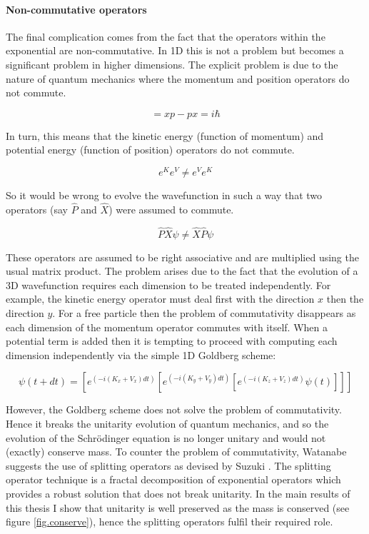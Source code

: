 \paragraph{Non-commutative operators}
The final complication comes from the fact that the operators within the exponential are non-commutative. In 1D this is not a problem but becomes a significant problem in higher dimensions. The explicit problem is due to the nature of quantum mechanics where the momentum and position operators do not commute.

\begin{equation}
 [x,p] = xp - px = i\hbar
\end{equation}

\noindent In turn, this means that the kinetic energy (function of momentum) and potential energy (function of position) operators do not commute.

\begin{equation}
e^{K}e^{V}   \ne  e^{V}e^{K} 
\end{equation}

\noindent So it would be wrong to evolve the wavefunction in such a way that two operators (say $\hat{P}$ and $\hat{X}$) were assumed to commute.

\begin{equation}
\hat{P} \hat{X} \psi \ne \hat{X} \hat{P} \psi
\end{equation}

\noindent These operators are assumed to be right associative and are multiplied using the usual matrix product. The problem arises due to the fact that the evolution of a 3D wavefunction requires each dimension to be treated independently. For example, the kinetic energy operator must deal first with the direction $x$ then the direction $y$. For a free particle then the problem of commutativity disappears as each dimension of the momentum operator commutes with itself. When a potential term is added then it is tempting to proceed with computing each dimension independently via the simple 1D Goldberg scheme:

\begin{equation}
\psi(t+dt) = [e^{(-i(K_x + V_x)dt)}  [e^{(-i(K_y + V_y)dt)}  [e^{(-i(K_z + V_z)dt)}\psi(t)]]]
\end{equation}

\noindent However, the Goldberg scheme does not solve the problem of commutativity. Hence it breaks the unitarity evolution of quantum mechanics, and so the evolution of the Schr\"odinger equation is no longer unitary and would not (exactly) conserve mass. To counter the problem of commutativity, Watanabe suggests the use of splitting operators as devised by Suzuki \citep{bib_suz}. The splitting operator technique is a fractal decomposition of exponential operators which provides a robust solution that does not break unitarity. In the main results of this thesis I show that unitarity is well preserved as the mass is conserved (see figure \ref{fig.conserve}), hence the splitting operators fulfil their required role.

